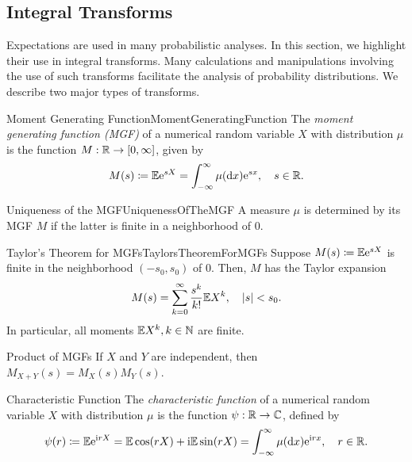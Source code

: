 \subsection{Integral Transforms}
Expectations are used in many probabilistic analyses. In this section, we highlight their use in integral transforms. Many calculations and manipulations involving the use of such transforms facilitate the analysis of probability distributions. We describe two major types of transforms.

\begin{defn}{Moment Generating Function}{MomentGeneratingFunction}
	The \textit{moment generating function (MGF)} of a numerical random variable \(X\) with distribution \(\mu\) is the function \(M : \mathbb{R} \to [0, \infty]\), given by
	\begin{equation*}
		M(s) \coloneqq \mathbb{E} \mathrm{e}^{sX} = \int_{-\infty}^{\infty} \mu(\mathrm{d} x) \mathrm{e}^{sx}, \quad s \in \mathbb{R}.
	\end{equation*}
\end{defn}

\begin{thm}{Uniqueness of the MGF}{UniquenessOfTheMGF}
	A measure \(\mu\) is determined by its MGF \(M\) if the latter is finite in a neighborhood of \(0\).
\end{thm}

\begin{thm}{Taylor's Theorem for MGFs}{TaylorsTheoremForMGFs}
	Suppose \(M(s) \coloneqq \mathbb{E} \mathrm{e}^{sX}\) is finite in the neighborhood \((-s_0, s_0)\) of \(0\). Then, \(M\) has the Taylor expansion
	\begin{equation*}
		M(s) = \sum_{k=0}^{\infty} \frac{s^k}{k!} \mathbb{E} X^k, \quad |s| < s_0.
	\end{equation*}
	In particular, all moments \(\mathbb{E} X^k, k \in \mathbb{N}\) are finite.
\end{thm}

\begin{thm}{Product of MGFs}{}
	If \(X\) and \(Y\) are independent, then \(M_{X+Y}(s) = M_X(s) M_Y(s)\).
\end{thm}

\begin{defn}{Characteristic Function}{}
	The \textit{characteristic function} of a numerical random variable \(X\) with distribution \(\mu\) is the function \(\psi : \mathbb{R} \to \mathbb{C}\), defined by
	\begin{equation*}
		\psi(r) \coloneqq \mathbb{E} \mathrm{e}^{\mathrm{i} r X} = \mathbb{E} \cos(r X) + \mathrm{i} \mathbb{E} \sin(r X) = \int_{-\infty}^{\infty} \mu(\mathrm{d} x) \mathrm{e}^{\mathrm{i} r x}, \quad r \in \mathbb{R}.
	\end{equation*}
\end{defn}

